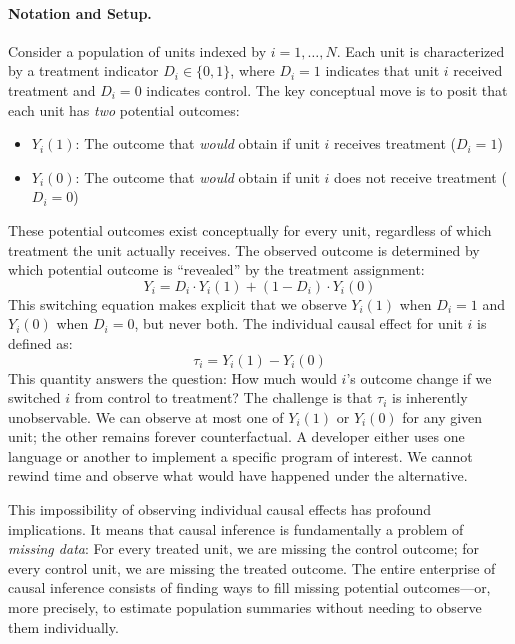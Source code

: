 \paragraph{Notation and Setup.}
Consider a population of units indexed by $i = 1, \ldots, N$.
Each unit is characterized by a treatment indicator $D_i \in \{0, 1\}$, where $D_i = 1$ indicates that unit $i$ received treatment and $D_i = 0$ indicates control.
The key conceptual move is to posit that each unit has \emph{two} potential outcomes:
\begin{itemize}[leftmargin=15pt]
    \item $Y_i(1)$: The outcome that \emph{would} obtain if unit $i$ receives treatment ($D_i = 1$)
    \item $Y_i(0)$: The outcome that \emph{would} obtain if unit $i$ does not receive treatment ($D_i = 0$)
\end{itemize}
These potential outcomes exist conceptually for every unit, regardless of which treatment the unit actually receives.
The observed outcome is determined by which potential outcome is ``revealed'' by the treatment assignment:
\begin{equation}
    Y_i = D_i \cdot Y_i(1) + (1 - D_i) \cdot Y_i(0)
\end{equation}
This switching equation makes explicit that we observe $Y_i(1)$ when $D_i = 1$ and $Y_i(0)$ when $D_i = 0$, but never both.
The individual causal effect for unit $i$ is defined as:
\begin{equation}
    \tau_i = Y_i(1) - Y_i(0)
\end{equation}
This quantity answers the question: How much would $i$'s outcome change if we switched $i$ from control to treatment?
The challenge is that $\tau_i$ is inherently unobservable.
We can observe at most one of $Y_i(1)$ or $Y_i(0)$ for any given unit; the other remains forever counterfactual.
A developer either uses one language or another to implement a specific program of interest.
We cannot rewind time and observe what would have happened under the alternative.

This impossibility of observing individual causal effects has profound implications.
It means that causal inference is fundamentally a problem of \emph{missing data}: For every treated unit, we are missing the control outcome; for every control unit, we are missing the treated outcome.
The entire enterprise of causal inference consists of finding ways to fill missing potential outcomes---or, more precisely, to estimate population summaries without needing to observe them individually.

